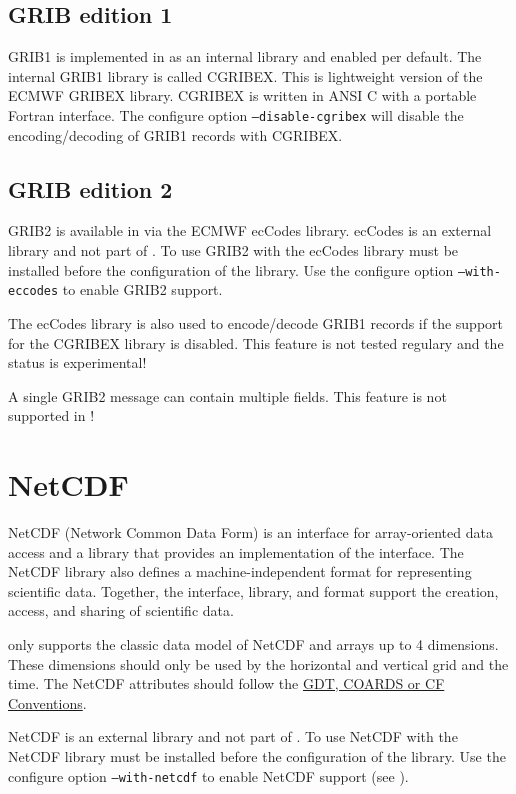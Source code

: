 \subsection{GRIB edition 1}

GRIB1 is implemented in {\CDI} as an internal library and enabled per default.
The internal GRIB1 library is called CGRIBEX. This is lightweight
version of the ECMWF GRIBEX library. CGRIBEX is written in ANSI C with a portable Fortran interface. 
The configure option \texttt{--disable-cgribex} will disable the encoding/decoding of GRIB1 records with CGRIBEX.

\subsection{GRIB edition 2}

GRIB2 is available in {\CDI} via the ECMWF ecCodes \cite{ecCodes} library.
ecCodes is an external library and not part of {\CDI}. To use GRIB2 with
{\CDI} the ecCodes library must be installed before the configuration
of the {\CDI} library. Use the configure option \texttt{--with-eccodes} to
enable GRIB2 support. 

The ecCodes library is also used to encode/decode GRIB1 records if the support for the CGRIBEX library is disabled.
This feature is not tested regulary and the status is experimental!

A single GRIB2 message can contain multiple fields. This feature is not supported in {\CDI}!

\section{NetCDF}

NetCDF \cite{NetCDF} (Network Common Data Form) is an interface for array-oriented data
access and a library that provides an implementation of the interface.
The NetCDF library also defines a machine-independent format for 
representing scientific data. Together, the interface, library, and 
format support the creation, access, and sharing of scientific data.

{\CDI} only supports the classic data model of NetCDF and arrays up to 4 dimensions.
These dimensions should only be used by the horizontal and vertical grid and the time.
The NetCDF attributes should follow the
\href{http://ftp.unidata.ucar.edu/software/netcdf/docs/conventions.html}
     {GDT, COARDS or CF Conventions}.

NetCDF is an external library and not part of {\CDI}. To use NetCDF with
{\CDI} the NetCDF library must be installed before the configuration
of the {\CDI} library. Use the configure option \texttt{--with-netcdf} to
enable NetCDF support (see ).

